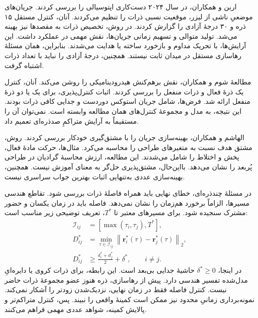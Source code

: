 اربن و همکاران، در سال ۲۰۲۴ دست‌کاری اپتوسیالی را بررسی کردند.
جریان‌های موضعیِ ناشی از لیزر، موقعیت نسبی ذرات را تنظیم می‌کردند.
آنان، کنترل مستقل ۱۵ ذره و ۳۰ درجهٔ آزادی را گزارش کردند.
در روش، تخصیص ذرات به مقصدها نیز بهینه می‌شد.
تولید متوالی و تسهیم زمانی جریان‌ها، نقش مهمی در عملکرد داشت.
این آرایش‌ها، با تحریک مداوم و بازخورد ساخته یا هدایت می‌شدند.
بنابراین، همان مسئلهٔ رهاسازی مستقل در میدان ثابت نیستند.
همچنین، درجهٔ آزادی را نباید با تعداد ذرات اشتباه گرفت.
\cite{Erben2024Optofluidic}

مطالعهٔ شوم و همکاران، نقش برهم‌کنش هیدرودینامیکی را روشن می‌کند.
آنان، کنترل یک ذرهٔ فعال و ذرات منفعل را بررسی کردند.
اثبات کنترل‌پذیری، برای یک یا دو ذرهٔ منفعل ارائه شد.
فرض‌ها، شامل جریان استوکس دوردست و جدایی کافی ذرات بودند.
این نتیجه، به مدل و مجموعهٔ کنترل‌های همان مطالعه وابسته است.
نمی‌توان آن را مستقیماً به آرایش متراکمِ صدذره‌ای تعمیم داد.
\cite{Shum2025HydrodynamicControl}

الهاشم و همکاران، بهینه‌سازی جریان را با مشتق‌گیری خودکار بررسی کردند.
روش، مشتق هدف نسبت به متغیرهای طراحی را محاسبه می‌کرد.
مثال‌ها، حرکت مادهٔ فعال، پخش و اختلاط را شامل می‌شدند.
این مطالعه، ارزش محاسبهٔ گرادیان در طراحی پُربعد را نشان می‌دهد.
بااین‌حال، مشتق‌پذیری حل‌گر به معنای آموزش  نیست.
همچنین، بهینه‌سازی عددی به‌تنهایی اثبات بهترین جواب سراسری نیست.
\cite{Alhashim2025DifferentiableFlow}

در مسئلهٔ چندذره‌ای، خطای نهایی باید همراه فاصلهٔ ذرات بررسی شود.
تقاطع هندسی مسیرها، الزاماً برخورد هم‌زمان را نشان نمی‌دهد.
فاصله باید در زمان یکسان و حضور مشترک سنجیده شود.
برای مسیرهای معتبر تا $T^{*}$، تعریف توضیحی زیر مناسب است:
\begin{equation}
\begin{aligned}
\mathcal{I}_{ij}
&=[\max(\tau_i,\tau_j),T^{*}],\\
D_{ij}^{*}
&=\min_{\tau\in\mathcal{I}_{ij}}
\left\|\mathbf{r}^{*}_{i}(\tau)-\mathbf{r}^{*}_{j}(\tau)\right\|_2,\\
D_{ij}^{*}
&\geq\frac{d_i^{*}+d_j^{*}}{2}+\delta^{*},
\qquad i\neq j.
\end{aligned}
\label{eq:lit-formation-active-interval-separation}
\end{equation}
در اینجا، $\delta^{*}\geq0$ حاشیهٔ جدایی بی‌بعد است.
این رابطه، برای ذرات کروی یا دایره‌ایِ مدل‌شده تفسیر هندسی دارد.
پیش از رهاسازی، ذره هنوز عضو مجموعهٔ ذرات حاضر نیست.
کنترل فاصله فقط در زمان نهایی، نزدیک‌شدن زودتر را آشکار نمی‌کند.
نمونه‌برداری زمانیِ محدود نیز ممکن است کمینهٔ واقعی را نبیند.
پس، کنترل متراکم‌تر و پالایش کمینه، شواهد عددی مهمی فراهم می‌کنند.

